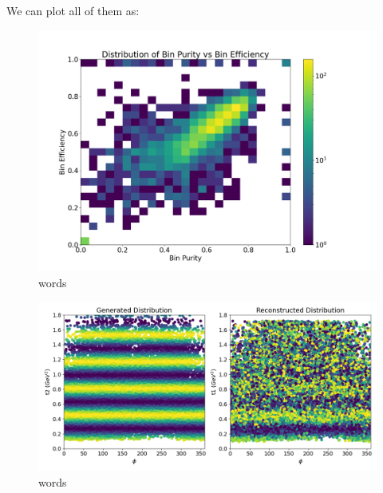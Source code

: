     
    We can plot all of them as:
    
    
    \begin{figure}[ht]
    \centering
    \includegraphics[trim={0 0 0 0},clip,width=\textwidth]{Chapters/Ch5-Further/0_IBU/pics/overview/t1_bin_purity_vs_bin_efficiency.png}
    \caption[words]{words}
    \label{fig:ibu10}
    \end{figure}
    
    
    \begin{figure}[ht]
    \centering
    \includegraphics[trim={0 0 0 0},clip,width=\textwidth]{Chapters/Ch5-Further/0_IBU/pics/complete/t1.png}
    \caption[words]{words}
    \label{fig:ibu4}
    \end{figure}
    

